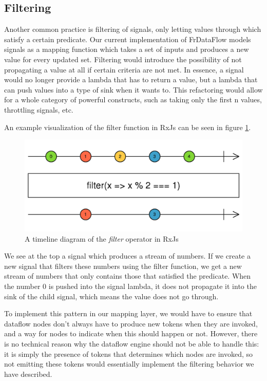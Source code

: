 \subsection{Filtering}

Another common practice is filtering of signals, only letting values through which satisfy a certain predicate. Our current implementation of FrDataFlow models signals as a mapping function which takes a set of inputs and produces a new value for every updated set. Filtering would introduce the possibility of not propagating a value at all if certain criteria are not met. In essence, a signal would no longer provide a lambda that has to return a value, but a lambda that can push values into a type of sink when it wants to. This refactoring would allow for a whole category of powerful constructs, such as taking only the first n values, throttling signals, etc. 

An example visualization of the filter function in RxJs can be seen in figure  \ref{fig:futurework-filtering-filter}. 

\begin{figure}[h!]
	\includegraphics[width=\textwidth]{images/FutureWork-Filtering-Filter.png}
	\caption{A timeline diagram of the \textit{filter} operator in RxJs}
	\label{fig:futurework-filtering-filter}
\end{figure}

We see at the top a signal which produces a stream of numbers. If we create a new signal that filters these numbers using the filter function, we get a new stream of numbers that only contains those that satisfied the predicate. When the number 0 is pushed into the signal lambda, it does not propagate it into the sink of the child signal, which means the value does not go through. 

To implement this pattern in our mapping layer, we would have to ensure that dataflow nodes don't always have to produce new tokens when they are invoked, and a way for nodes to indicate when this should happen or not. However, there is no technical reason why the dataflow engine should not be able to handle this: it is simply the presence of tokens that determines which nodes are invoked, so not emitting these tokens would essentially implement the filtering behavior we have described.


